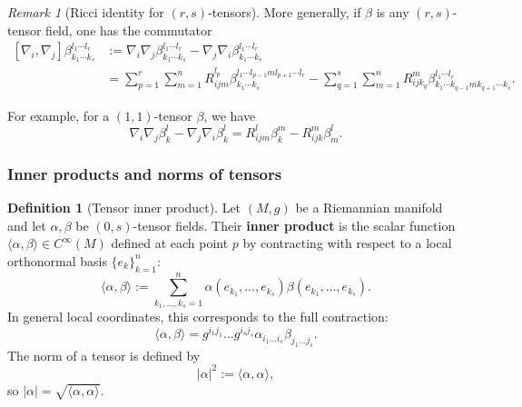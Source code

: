 \documentclass[11pt]{article}
\theoremstyle{plain}
\theoremstyle{definition}
\newtheorem{definition}[theorem]{Definition}
\theoremstyle{remark}
\newtheorem{remark}[theorem]{Remark}
\begin{document}
\begin{remark}[Ricci identity for $(r,s)$-tensors]
    More generally, if $\beta $ is any $\left(  r,s\right)  $-tensor field, one has the
commutator
\begin{align}
\left[  \nabla_{i},\nabla_{j}\right]  \beta_{k_{1}\cdots k_{s}}^{l_{1}%
\cdots l_{r}}  &  := \nabla_{i}\nabla_{j}\beta_{k_{1}\cdots k_{s}}^{l
_{1}\cdots l_{r}}-\nabla_{j}\nabla_{i}\beta_{k_{1}\cdots k_{s}}^{l_{1}\cdots l_{r}} \nonumber \\
&  =\sum_{p=1}^{r} \sum_{m=1}^n R_{ijm}^{l_{p}}\beta_{k_{1}\cdots k_{s}}^{l_{1}\cdots
l_{p-1}ml_{p+1}\cdots l_{r}}-\sum_{q=1}^{s} \sum_{m=1}^n R_{ijk_{q}}^{m}%
\beta_{k_{1}\cdots k_{q-1}mk_{q+1}\cdots k_{s}}^{l_{1}\cdots l_{r}}. \label{eq:ricci-identity-mixed-tensor}
\end{align}
\end{remark}


For example, for a $(1,1)$-tensor $\beta$, we have
\begin{equation}\label{eq:ricci-identity-one-one-tensor}
    \nabla_i\nabla_j \beta_k^l - \nabla_j \nabla_i \beta_k^l =
    R_{ijm}^l\beta_k^m - R_{ijk}^m \beta_m^l.
\end{equation}

\subsubsection{Inner products and norms of tensors}

\begin{definition}[Tensor inner product]
\label{def:tensor_inner_product}
    Let $(M, g)$ be a Riemannian manifold and let $\alpha, \beta$ be $(0,s)$-tensor fields.
    Their \textbf{inner product} is the scalar function $\langle \alpha, \beta \rangle \in C^\infty(M)$ defined at each point $p$ by contracting with respect to a local orthonormal basis $\{e_k\}_{k=1}^n$:
    \begin{equation}
        \langle \alpha , \beta \rangle := \sum_{k_1, \dots, k_s=1}^{n} \alpha (e_{k_1}, \dots, e_{k_s}) \beta (e_{k_1}, \dots, e_{k_s}).
    \end{equation}
    In general local coordinates, this corresponds to the full contraction:
    \begin{equation}
        \langle \alpha , \beta \rangle = g^{i_1 j_1} \dots g^{i_s j_s} \alpha_{i_1 \dots i_s} \beta_{j_1 \dots j_s}.
    \end{equation}
    The norm of a tensor is defined by
\begin{equation}
    |\alpha|^2 := \langle \alpha, \alpha \rangle ,
\end{equation}
so $|\alpha| = \sqrt{\langle \alpha, \alpha \rangle}$.
\end{definition}
\end{document}
